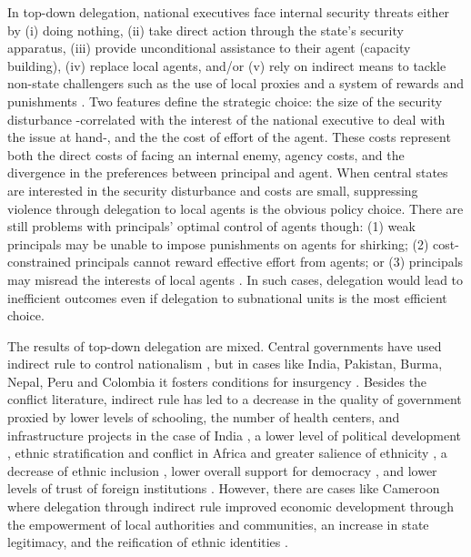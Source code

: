 \documentclass[12pt]{amsart}
\numberwithin{equation}{section}
\theoremstyle{definition}
\theoremstyle{definition}
\theoremstyle{definition}
\begin{document}
In top-down delegation, national executives face internal security threats either by (i) doing nothing, (ii) take direct action through the state's security apparatus, (iii) provide unconditional assistance to their agent (capacity building), (iv) replace local agents, and/or (v) rely on indirect means to tackle non-state challengers such as the use of local proxies and a system of rewards and punishments \citep{berman_lake_2019}.  Two features define the strategic choice: the size of the security disturbance -correlated with the interest of the national executive to deal with the issue at hand-, and the the cost of effort of the agent. These costs represent both the direct costs of facing an internal enemy, agency costs, and the divergence in the preferences between principal and agent. When central states are interested in the security disturbance and costs are small, suppressing violence through delegation to local agents is the obvious policy choice. There are still problems with principals’ optimal control of agents though: (1) weak principals may be unable to impose punishments on agents for shirking; (2) cost-constrained principals cannot reward effective effort from agents; or (3) principals may misread the interests of local agents \citep{berman_lake_2019}. In such cases, delegation would lead to inefficient outcomes even if delegation to subnational units is the most efficient choice. 
   
The results of top-down delegation are mixed. Central governments have used indirect rule to control nationalism \citep{siroky_2021}, but in cases like India, Pakistan, Burma, Nepal, Peru and Colombia it fosters conditions for insurgency \citep{Mukherjee_2018}. Besides the conflict literature, indirect rule has led to a decrease in the quality of government proxied by lower levels of schooling, the number of health centers, and infrastructure projects in the case of India \citep{lyer_2010}, a lower level of political development \citep{lange_2004}, ethnic stratification and conflict in Africa \citep{Blanton_etal_2001} and greater salience of ethnicity \citep{Mcnamee_2019}, a decrease of ethnic inclusion \citep{mcalexander_2020}, lower overall support for democracy \citep{lechler_2018}, and lower levels of trust of foreign institutions \citep{Okoye_2021}. However, there are cases like Cameroon where delegation through indirect rule improved economic development through the empowerment of local authorities and communities, an increase in state legitimacy, and the reification of ethnic identities \citep{letsa_2020}.                       
\end{document}
